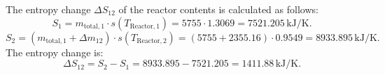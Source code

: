 The entropy change \( \Delta S_{12} \) of the reactor contents is calculated as follows:  
\[
S_1 = m_{\text{total},1} \cdot s(T_{\text{Reactor},1}) = 5755 \cdot 1.3069 = 7521.205 \, \text{kJ/K}.
\]  
\[
S_2 = (m_{\text{total},1} + \Delta m_{12}) \cdot s(T_{\text{Reactor},2}) = (5755 + 2355.16) \cdot 0.9549 = 8933.895 \, \text{kJ/K}.
\]  
The entropy change is:  
\[
\Delta S_{12} = S_2 - S_1 = 8933.895 - 7521.205 = 1411.88 \, \text{kJ/K}.
\]